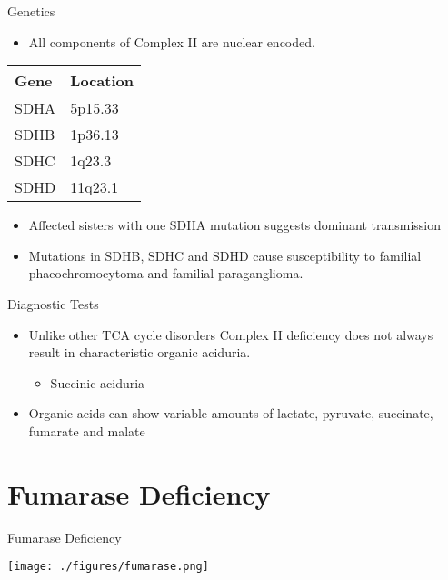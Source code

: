 \documentclass[presentation, smaller]{beamer}
\begin{document}
\begin{frame}[label={sec:org91ac27a}]{Genetics}
\begin{itemize}
\item All components of Complex II are nuclear encoded.
\end{itemize}

\begin{center}
\begin{tabular}{ll}
Gene & Location\\
\hline
SDHA & 5p15.33\\
SDHB & 1p36.13\\
SDHC & 1q23.3\\
SDHD & 11q23.1\\
\end{tabular}
\end{center}


\begin{itemize}
\item Affected sisters with one SDHA mutation suggests dominant
transmission
\item Mutations in SDHB, SDHC and SDHD cause susceptibility to familial
phaeochromocytoma and familial paraganglioma.
\end{itemize}
\end{frame}
\begin{frame}[label={sec:org3eb3d3b}]{Diagnostic Tests}
\begin{itemize}
\item Unlike other TCA cycle disorders Complex II deficiency does not always
result in characteristic organic aciduria.
\begin{itemize}
\item Succinic aciduria
\end{itemize}
\item Organic acids can show variable amounts of lactate, pyruvate, succinate, fumarate and malate
\end{itemize}
\end{frame}

\section{Fumarase Deficiency}
\label{sec:org59d86e5}
\begin{frame}[label={sec:orgee2106f}]{Fumarase Deficiency}
\begin{center}
\texttt{[image: ./figures/fumarase.png]}
\end{center}
\end{frame}
\end{document}
